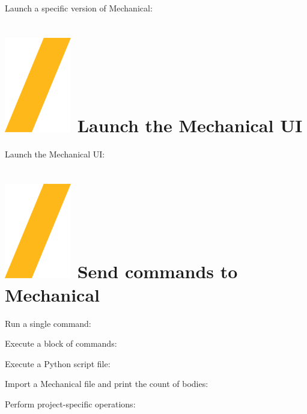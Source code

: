 \documentclass[9pt,landscape]{article}
\begin{document}
\begin{multicols}{3}
Launch a specific version of Mechanical:

\section{\includegraphics[height=\fontcharht\font`\S]{slash.png} Launch the  Mechanical UI}
Launch the  Mechanical UI:



\vfill
\section{\includegraphics[height=\fontcharht\font`\S]{slash.png} Send commands to Mechanical}
Run a single command:

Execute a block of commands:

Execute a Python script file:

Import a Mechanical file and print the count of bodies:

Perform project-specific operations:


\end{multicols}
\end{document}
